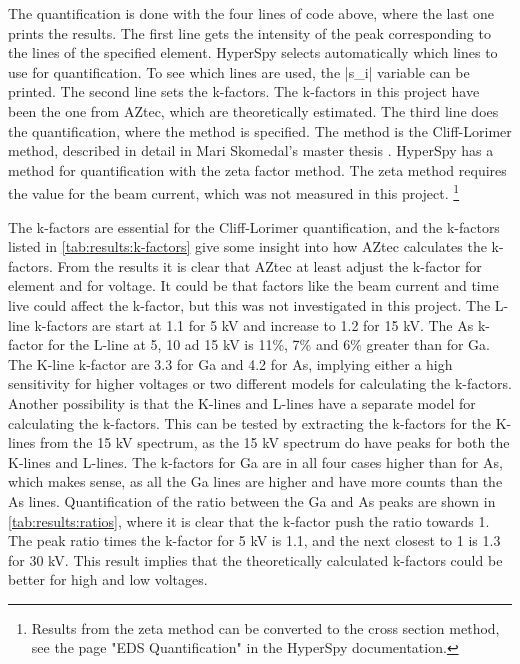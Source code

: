The quantification is done with the four lines of code above, where the last one prints the results.
The first line gets the intensity of the peak corresponding to the lines of the specified element.
HyperSpy selects automatically which lines to use for quantification.
To see which lines are used, the \cverb|s_i| variable can be printed.
The second line sets the k-factors.
The k-factors in this project have been the one from AZtec, which are theoretically estimated.
The third line does the quantification, where the method is specified.
The method is the Cliff-Lorimer method, described in detail in Mari Skomedal's master thesis \cite[Sec. 2.2.3]{skomedal_improving_2022}.
HyperSpy has a method for quantification with the zeta factor method.
The zeta method requires the value for the beam current, which was not measured in this project. \footnote{Results from the zeta method can be converted to the cross section method, see the page "EDS Quantification" in the HyperSpy documentation.}


The k-factors are essential for the Cliff-Lorimer quantification, and the k-factors listed in \cref{tab:results:k-factors} give some insight into how AZtec calculates the k-factors.
From the results it is clear that AZtec at least adjust the k-factor for element and for voltage.
It could be that factors like the beam current and time live could affect the k-factor, but this was not investigated in this project.
The L-line k-factors are start at 1.1 for 5 kV and increase to 1.2 for 15 kV.
The As k-factor for the L-line at 5, 10 ad 15 kV is 11\%, 7\% and 6\% greater than for Ga.
The K-line k-factor are 3.3 for Ga and 4.2 for As, implying either a high sensitivity for higher voltages or two different models for calculating the k-factors.
Another possibility is that the K-lines and L-lines have a separate model for calculating the k-factors.
This can be tested by extracting the k-factors for the K-lines from the 15 kV spectrum, as the 15 kV spectrum do have peaks for both the K-lines and L-lines.
The k-factors for Ga are in all four cases higher than for As, which makes sense, as all the Ga lines are higher and have more counts than the As lines.
Quantification of the ratio between the Ga and As peaks are shown in \cref{tab:results:ratios}, where it is clear that the k-factor push the ratio towards 1.
The peak ratio times the k-factor for 5 kV is 1.1, and the next closest to 1 is 1.3 for 30 kV.
This result implies that the theoretically calculated k-factors could be better for high and low voltages.








